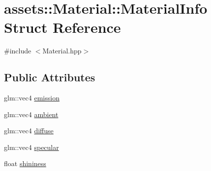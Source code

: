 \hypertarget{structassets_1_1Material_1_1MaterialInfo}{\section{assets\-:\-:Material\-:\-:Material\-Info Struct Reference}
\label{structassets_1_1Material_1_1MaterialInfo}
}


{\ttfamily \#include $<$Material.\-hpp$>$}

\subsection*{Public Attributes}
\begin{DoxyCompactItemize}
\item 
glm\-::vec4 \hyperlink{structassets_1_1Material_1_1MaterialInfo_a5e9b6fae11296a13a4151d84f38661c1}{emission}
\item 
glm\-::vec4 \hyperlink{structassets_1_1Material_1_1MaterialInfo_a0e0392f56d9bf910ec5d6cd92aee5557}{ambient}
\item 
glm\-::vec4 \hyperlink{structassets_1_1Material_1_1MaterialInfo_a80de7c8264da065d1532c87893883b9b}{diffuse}
\item 
glm\-::vec4 \hyperlink{structassets_1_1Material_1_1MaterialInfo_af3226e0ef1e991c434bba8c6ecf1c54b}{specular}
\item 
float \hyperlink{structassets_1_1Material_1_1MaterialInfo_a7d5c115203d9681d531bead7326f4be1}{shininess}
\end{DoxyCompactItemize}


